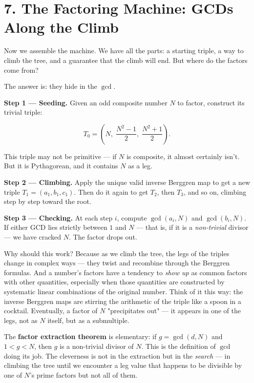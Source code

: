 \section*{7. The Factoring Machine: GCDs Along the Climb}


Now we assemble the machine. We have all the parts: a starting triple, a way to climb the tree, and a guarantee that the climb will end. But where do the factors come from?

The answer is: they hide in the $\gcd$.

\textbf{Step 1 --- Seeding.} Given an odd composite number $N$ to factor, construct its trivial triple:

\[T_0 = \left(N,\;\frac{N^2 - 1}{2},\;\frac{N^2 + 1}{2}\right).\]

This triple may not be primitive --- if $N$ is composite, it almost certainly isn't. But it is Pythagorean, and it contains $N$ as a leg.

\textbf{Step 2 --- Climbing.} Apply the unique valid inverse Berggren map to get a new triple $T_1 = (a_1, b_1, c_1)$. Then do it again to get $T_2$, then $T_3$, and so on, climbing step by step toward the root.

\textbf{Step 3 --- Checking.} At each step $i$, compute $\gcd(a_i, N)$ and $\gcd(b_i, N)$. If either GCD lies strictly between $1$ and $N$ --- that is, if it is a \textit{non-trivial} divisor --- we have cracked $N$. The factor drops out.

Why should this work? Because as we climb the tree, the legs of the triples change in complex ways --- they twist and recombine through the Berggren formulas. And a number's factors have a tendency to \textit{show up} as common factors with other quantities, especially when those quantities are constructed by systematic linear combinations of the original number. Think of it this way: the inverse Berggren maps are stirring the arithmetic of the triple like a spoon in a cocktail. Eventually, a factor of $N$ "precipitates out" --- it appears in one of the legs, not as $N$ itself, but as a submultiple.

The \textbf{factor extraction theorem} is elementary: if $g = \gcd(d, N)$ and $1 < g < N$, then $g$ is a non-trivial divisor of $N$. This is the definition of $\gcd$ doing its job. The cleverness is not in the extraction but in the \textit{search} --- in climbing the tree until we encounter a leg value that happens to be divisible by one of $N$'s prime factors but not all of them.

